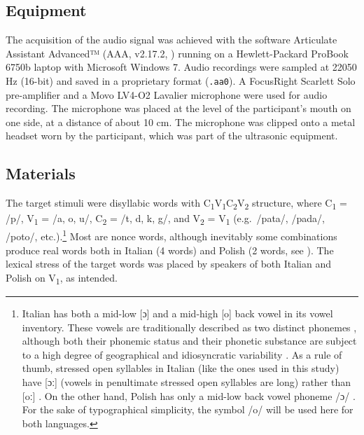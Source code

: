 \documentclass[charis]{glossa}
\begin{document}
\hypertarget{equipment}{%
\subsection{Equipment}\label{equipment}}

The acquisition of the audio signal was achieved with the software
Articulate Assistant Advanced™ (AAA, v2.17.2, \citealt{articulate2011})
running on a Hewlett-Packard ProBook 6750b laptop with Microsoft Windows
7. Audio recordings were sampled at 22050 Hz (16-bit) and saved in a
proprietary format (\texttt{.aa0}). A FocusRight Scarlett Solo
pre-amplifier and a Movo LV4-O2 Lavalier microphone were used for audio
recording. The microphone was placed at the level of the participant's
mouth on one side, at a distance of about 10 cm. The microphone was
clipped onto a metal headset worn by the participant, which was part of
the ultrasonic equipment.

\hypertarget{materials}{%
\subsection{Materials}\label{materials}}

\label{s:materials}

The target stimuli were disyllabic words with
C\textsubscript{1}V\textsubscript{1}C\textsubscript{2}V\textsubscript{2}
structure, where C\textsubscript{1} = /p/, V\textsubscript{1} = /a, o,
u/, C\textsubscript{2} = /t, d, k, g/, and V\textsubscript{2} =
V\textsubscript{1} (e.g.~/pata/, /pada/, /poto/,
etc.).\footnote{Italian has both a mid-low [ɔ] and a mid-high [o] back vowel in its vowel inventory. These vowels are traditionally described as two distinct phonemes \citep{kramer2009}, although both their phonemic status and their phonetic substance are subject to a high degree of geographical and idiosyncratic variability \citep{renwick2016}. As a rule of thumb, stressed open syllables in Italian (like the ones used in this study) have [ɔː] (vowels in penultimate stressed open syllables are long) rather than [oː] \citep{renwick2016}. On the other hand, Polish has only a mid-low back vowel phoneme /ɔ/ \citep{gussmann2007}. For the sake of typographical simplicity, the symbol /o/ will be used here for both languages.}
Most are nonce words, although inevitably some combinations produce real
words both in Italian (4 words) and Polish (2 words, see
). The lexical stress of the target words was placed by
speakers of both Italian and Polish on V\textsubscript{1}, as intended.
\end{document}
